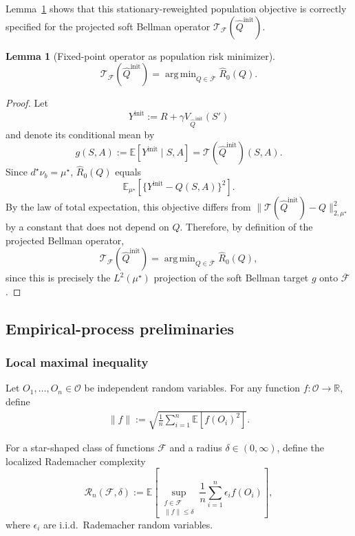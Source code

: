 \documentclass{article}
\DeclareMathOperator*{\argmin}{arg\,min}
\theoremstyle{plain}
\newtheorem{lemma}{Lemma}
\theoremstyle{definition}
\theoremstyle{remark}
\newcommand{\E}{\mathbb{E}}
\begin{document}
Lemma~\ref{lem:proj-pop-risk} shows that this stationary-reweighted population
objective is correctly specified for the projected soft Bellman operator
\(\mathcal T_{\mathcal F}(\hat Q^{\mathrm{init}})\).

\begin{lemma}[Fixed-point operator as population risk minimizer]
\label{lem:proj-pop-risk}
\[
\mathcal T_{\mathcal F}(\hat Q^{\mathrm{init}})
= \argmin_{Q \in \overline{\mathcal F}} \hat R_0(Q).
\]
\end{lemma}

\begin{proof}
Let
\[
Y^{\mathrm{init}}
:=
R + \gamma V_{\hat Q^{\mathrm{init}}}(S')
\]
and denote its conditional mean by
\[
g(S,A)
:=
\E\!\left[Y^{\mathrm{init}}\mid S,A\right]
=
\mathcal T(\hat Q^{\mathrm{init}})(S,A).
\]
Since \(d^\star\nu_b=\mu^\star\), \(\hat R_0(Q)\) equals
\[
\E_{\mu^\star}\!\left[
  \bigl\{
    Y^{\mathrm{init}}
    - Q(S,A)
  \bigr\}^2
\right].
\]
By the law of total expectation, this objective differs from
\(\|\mathcal T(\hat Q^{\mathrm{init}})-Q\|_{2,\mu^\star}^2\) by a constant
that does not depend on \(Q\). Therefore, by definition of the projected
Bellman operator,
\[
\mathcal T_{\mathcal F}(\hat Q^{\mathrm{init}})
=
\argmin_{Q \in \overline{\mathcal F}} \hat R_0(Q),
\]
since this is precisely the $L^2(\mu^\star)$ projection of the soft Bellman
target $g$ onto $\overline{\mathcal F}$.
\end{proof}

\subsection{Empirical-process preliminaries}

\subsubsection{Local maximal inequality}

Let $O_1,\ldots,O_n \in \mathcal{O}$ be independent random variables. For any
function $f:\mathcal{O} \to \mathbb{R}$, define
\begin{align}
    \|f\| := \sqrt{\frac{1}{n} \sum_{i=1}^n\mathbb{E}[f(O_i)^2]}.
\end{align}

For a star-shaped class of functions $\mathcal{F}$ and a radius
$\delta \in (0,\infty)$, define the localized Rademacher complexity
\[
\mathcal{R}_n(\mathcal{F}, \delta)
:=
\mathbb{E}\left[
\sup_{\substack{f \in \mathcal{F} \\ \|f\| \le \delta}}
\frac{1}{n} \sum_{i=1}^n \epsilon_i f(O_i)
\right],
\]
where $\epsilon_i$ are i.i.d.\ Rademacher random variables.
\end{document}
